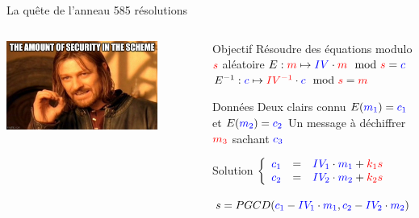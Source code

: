 
\begin{frame}{La quête de l'anneau \FiveStar \hfill 585 résolutions}
    \begin{columns}[c]
        \begin{center}                  
            \includegraphics[width=0.8\textwidth]{img/meme/la-quete-intro.png}
        \end{center}

           \begin{outline}
               \1 Objectif
                \2 Résoudre des équations modulo $\textcolor{red}{s}$ aléatoire 
                \2 $E : \u{m} \mapsto \k{IV}\cdot \u{m} \mod \u{s} = \k{c}$
                \2 $E^{-1} : \k{c} \mapsto \u{IV^{-1}}\cdot \k{c} \mod \u{s} = \u{m}$

                \vspace{0.3cm}
                \pause
                
               \1 Données
                \2 Deux clairs connu $E(\textcolor{blue}{m_1}) = \textcolor{blue}{c_1}$ et $E(\textcolor{blue}{m_2}) = \textcolor{blue}{c_2}$
                \2 Un message à déchiffrer $\textcolor{red}{m_3}$ sachant $\textcolor{blue}{c_3}$
               
                \vspace{0.3cm}
                \pause 
                
               \1 Solution
                \2 $\left\{ \begin{array}{r c l} \textcolor{blue}{c_1} &=& \textcolor{blue}{IV_1}\cdot\textcolor{blue}{m_1}+\textcolor{red}{k_1}\textcolor{red}{s} \\
                        \textcolor{blue}{c_2} &=& \textcolor{blue}{IV_2}\cdot\textcolor{blue}{m_2} +\textcolor{red}{k_2}\textcolor{red}{s} \\
                    \end{array}
                \right.$

                
                \pause
                \2 $s = PGCD(\textcolor{blue}{c_1}-\textcolor{blue}{IV_1}\cdot\textcolor{blue}{m_1},\textcolor{blue}{c_2}-\textcolor{blue}{IV_2}\cdot\textcolor{blue}{m_2})$ \flag{}
           \end{outline}
    \end{columns}
\end{frame}


